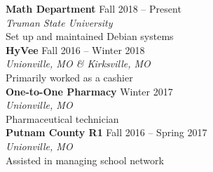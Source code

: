 \documentclass[10pt,letterpaper,ragged2e]{altacv}
\begin{document}
\textbf{Math Department} \hfill Fall 2018 -- Present\vspace{-2pt}\\
\textit{Truman State University}\\
\hspace{1em}Set up and maintained Debian systems\\

\textbf{HyVee} \hfill Fall 2016 -- Winter 2018\vspace{-2pt}\\
\textit{Unionville, MO \& Kirksville, MO}\\
\hspace{1em}Primarily worked as a cashier\\

\textbf{One-to-One Pharmacy} \hfill Winter 2017\vspace{-2pt}\\
\textit{Unionville, MO}\\
\hspace{1em}Pharmaceutical technician\\

\textbf{Putnam County R1} \hfill Fall 2016 -- Spring 2017\vspace{-2pt}\\
\textit{Unionville, MO}\\
\hspace{1em}Assisted in managing school network\\
\clearpage

\nocite{*}
\end{document}
